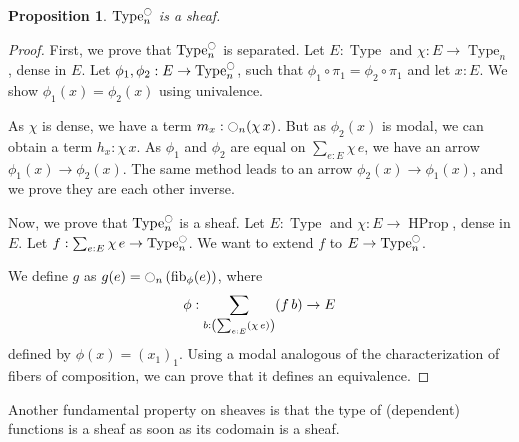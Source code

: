 \documentclass[preprint,9pt,numbers]{sigplanconf}
\newtheorem{prop}[thm]{Proposition}
\newtheorem{lem}[thm]{Lemma}
\newcommand{\mynote}[2]{
    \fbox{\bfseries\sffamily\scriptsize#1}
    {\small$\blacktriangleright$\textsf{\emph{#2}}$\blacktriangleleft$}~}
\newcommand\kq[1]{\mynote{KQ}{#1}}
\DeclareMathOperator{\Type}{Type}
\DeclareMathOperator{\HProp}{HProp}
\newcommand{\modal}{\ensuremath{\ocircle}}
\newcommand \fib[2] {\mathrm{fib}_{#1}(#2)}
\newenvironment{mymath}[1][-0em]{%
  \newcommand\mymathaux{\vspace{#1}}%
  \vspace{#1}%
  \begin{equation*}%
  }{ %
    \mymathaux%
  \end{equation*}}
\begin{document}
\begin{prop}\label{prop:sheaf-is-sheaf}
  $\Type_n^\modal$ is a sheaf.
\end{prop}
\begin{proof}
  First, we prove that $\Type_n^\modal$ is separated. Let $E:\Type$
  and $\chi:E \to \Type_n$, dense in $E$. Let $\phi_1,\phi_2:E \to
  \Type_n^\modal$, such that $\phi_1 \circ \pi_1 = \phi_2 \circ
  \pi_1$ and let $x:E$. We show $\phi_1(x) = \phi_2(x)$ using
  univalence.

  As $\chi$ is dense, we have a term $m_x : \modal_n(\chi\, x)$.
  But as $\phi_2(x)$ is modal, we can obtain a term $h_x : \chi\,
  x$. 
  As $\phi_1$ and $\phi_2$ are equal on $\sum_{e:E}\chi\, e$, we
  have an arrow $\phi_1(x) \to \phi_2(x)$.
  The same method leads to an arrow $\phi_2 (x) \to \phi_1 (x)$, and we
  prove they are each other inverse.

  Now, we prove that $\Type_n^\modal$ is a sheaf. Let $E:\Type$ and
  $\chi:E \to \HProp$, dense in $E$. Let $f:\sum_{e:E} \chi\, e \to
  \Type_n^\modal$. We want to extend $f$ to $E \to \Type_n^\modal$.

  We define $g$ as $g(e) = \modal_n \left( \fib \phi {e} \right)$,
  where
  \begin{mymath}[0em]\phi : \sum_{b:\left(\sum_{e:E} (\chi\, e)\right)} (f\,
    b) \to E\end{mymath}%
  defined by $\phi(x) = (x_1)_1$.
Using a modal analogous of the characterization of fibers of composition, we can prove that it
defines an equivalence.
\end{proof}
Another fundamental property on sheaves is that the type of (dependent)
functions is a sheaf as soon as its codomain is a sheaf.
\end{document}
